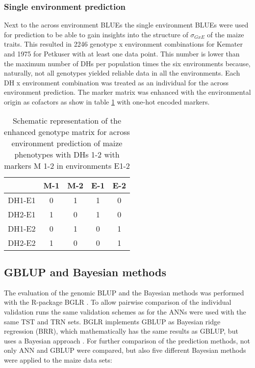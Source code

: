 \subsubsection{Single environment prediction}
Next to the across environment BLUEs the single environment BLUEs were used for prediction
to be able to gain insights into the structure of $\sigma_{GxE}$ of the maize traits. This
resulted in 2246 genotype x environment combinations for Kemater and 1975 for Petkuser
with at least one data point. This number is lower than the maximum number of DHs per
population times the six environments because, naturally, not all genotypes yielded
reliable data in all the environments. Each DH x environment combination was treated as an
individual for the across environment prediction. The marker matrix was enhanced with the
environmental origin as cofactors as show in table \ref{tab:envmarker} with one-hot
encoded markers.

\onehalfspacing
\begin{table}[H]
 \centering
 \caption[Environmentally enhanced marker matrix]{Schematic representation of the enhanced genotype matrix for across environment prediction of maize phenotypes with DHs 1-2 with markers M 1-2 in environments E1-2}
 \label{tab:envmarker}
 \begin{tabular}{l|cccc}
 \toprule
   & M-1 & M-2 & E-1 & E-2 \\
 \midrule
 DH1-E1 & 0 & 1 & 1 & 0 \\
 DH2-E1 & 1 & 0 & 1 & 0 \\
 DH1-E2 & 0 & 1 & 0 & 1 \\
 DH2-E2 & 1 & 0 & 0 & 1 \\           
 \bottomrule
 \end{tabular}
\end{table}
\doublespacing

\subsection{GBLUP and Bayesian methods} \label{met:blup:bayes}

The evaluation of the genomic BLUP and the Bayesian methods was performed with the
R-package BGLR \cite{BGLR}. To allow pairwise comparison of the individual validation runs
the same validation schemes as for the ANNs were used with the same TST and TRN sets. BGLR
implements GBLUP as Bayesian ridge regression (BRR), which mathematically has the same
results as GBLUP, but uses a Bayesian approach \cite{BGLR}. For further comparison of
the prediction methods, not only ANN and GBLUP were compared, but also five different
Bayesian methods were applied to the maize data sets:

